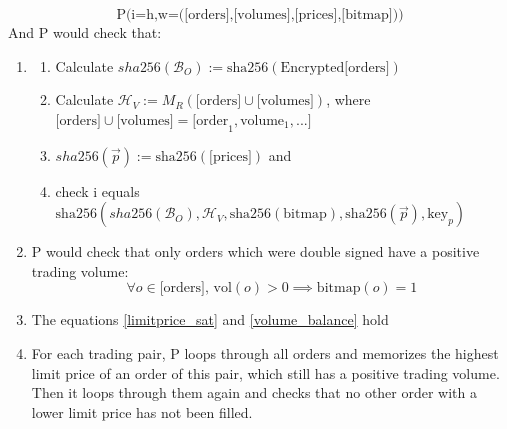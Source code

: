\documentclass[11pt,parskip=full]{scrartcl}%
\begin{document}
\begin{appendices}
\begin{equation}
\text{P(i=h,}
\text{w=([orders],[volumes],[prices],[bitmap]))} 
\end{equation}
And P would check that:
\begin{enumerate}
\item  \begin{enumerate}
  \item Calculate $sha256(\mathcal{B}_O) := \text{sha256}(\text{Encrypted[orders]})$
    \item Calculate  $\mathcal{H}_V := M_R(\text{[orders]} \cup \text{[volumes]})$,\newline
where $\text{[orders]} \cup \text{[volumes]} = \text{[order}_1, \text{volume}_1, ...] $
  \item $sha256(\vec{p}) := \text{sha256}(\text{[prices]})$ and
    \item check i equals $ \text{sha256}(sha256(\mathcal{B}_O),\mathcal{H}_V, \text{sha256}(\text{bitmap}), \text{sha256}(\vec{p}), \text{key}_p) $
    \end{enumerate}
\item P would check that only orders which were double signed have a positive trading volume:
\begin{equation}
\forall o \in \text{[orders], vol}(o)>0 \implies \text{bitmap}(o) = 1 
\end{equation}
\item The equations \ref{limitprice_sat} and \ref{volume_balance} hold
\item For each trading pair, P loops through all orders and memorizes the highest limit price of an order of this pair, which still has a positive trading volume. 
Then it loops through them again and checks that no other order with a lower limit price has not been filled. 
\end{enumerate}


\end{appendices}
\end{document}
